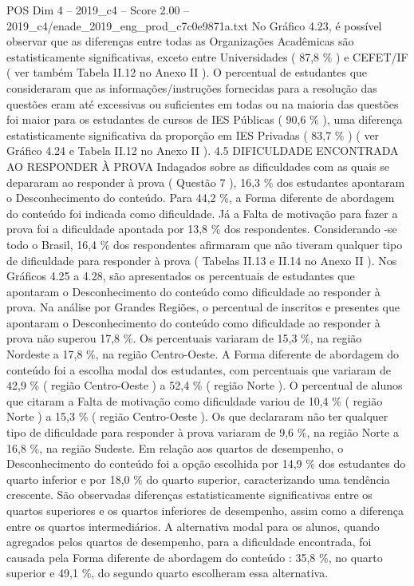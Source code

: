 \begin{textsample}{POS Dim 4 – 2019\_c4 – Score 2.00 – 2019\_c4/enade\_2019\_eng\_prod\_c7c0e9871a.txt}
No Gráfico 4.23, é possível observar que as diferenças entre todas as Organizações Acadêmicas são estatisticamente significativas, exceto entre Universidades ( 87,8 \% ) e CEFET/IF ( ver também Tabela II.12 no Anexo II ).
O percentual de estudantes que consideraram que as informações/instruções fornecidas para a resolução das questões eram até excessivas ou suficientes em todas ou na maioria das questões foi maior para os estudantes de cursos de IES Públicas ( 90,6 \% ), uma diferença estatisticamente significativa da proporção em IES Privadas ( 83,7 \% ) ( ver Gráfico 4.24 e Tabela II.12 no Anexo II ). 4.5 DIFICULDADE ENCONTRADA AO RESPONDER À PROVA Indagados sobre as dificuldades com as quais se depararam ao responder à prova ( Questão 7 ), 16,3 \% dos estudantes apontaram o Desconhecimento do conteúdo.
Para 44,2 \%, a Forma diferente de abordagem do conteúdo foi indicada como dificuldade.
Já a Falta de motivação para fazer a prova foi a dificuldade apontada por 13,8 \% dos respondentes.
Considerando -se todo o Brasil, 16,4 \% dos respondentes afirmaram que não tiveram qualquer tipo de dificuldade para responder à prova ( Tabelas II.13 e II.14 no Anexo II ).
Nos Gráficos 4.25 a 4.28, são apresentados os percentuais de estudantes que apontaram o Desconhecimento do conteúdo como dificuldade ao responder à prova.
Na análise por Grandes Regiões, o percentual de inscritos e presentes que apontaram o Desconhecimento do conteúdo como dificuldade ao responder à prova não superou 17,8 \%.
Os percentuais variaram de 15,3 \%, na região Nordeste a 17,8 \%, na região Centro-Oeste.
A Forma diferente de abordagem do conteúdo foi a escolha modal dos estudantes, com percentuais que variaram de 42,9 \% ( região Centro-Oeste ) a 52,4 \% ( região Norte ).
O percentual de alunos que citaram a Falta de motivação como dificuldade variou de 10,4 \% ( região Norte ) a 15,3 \% ( região Centro-Oeste ).
Os que declararam não ter qualquer tipo de dificuldade para responder à prova variaram de 9,6 \%, na região Norte a 16,8 \%, na região Sudeste.
Em relação aos quartos de desempenho, o Desconhecimento do conteúdo foi a opção escolhida por 14,9 \% dos estudantes do quarto inferior e por 18,0 \% do quarto superior, caracterizando uma tendência crescente.
São observadas diferenças estatisticamente significativas entre os quartos superiores e os quartos inferiores de desempenho, assim como a diferença entre os quartos intermediários.
A alternativa modal para os alunos, quando agregados pelos quartos de desempenho, para a dificuldade encontrada, foi causada pela Forma diferente de abordagem do conteúdo : 35,8 \%, no quarto superior e 49,1 \%, do segundo quarto escolheram essa alternativa.

\end{textsample}
